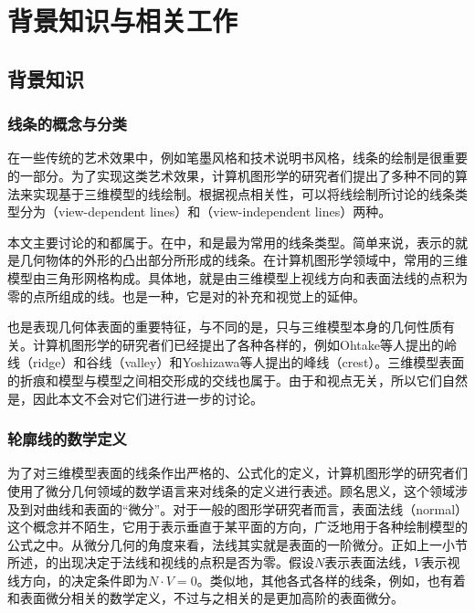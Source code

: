 \chapter{背景知识与相关工作}

\section{背景知识}

\subsection{线条的概念与分类}
\label{sec:diff_geo}

在一些传统的艺术效果中，例如笔墨风格和技术说明书风格，线条的绘制是很重要的一部分。为了实现这类艺术效果，计算机图形学的研究者们提出了多种不同的算法来实现基于三维模型的线绘制。根据视点相关性，可以将线绘制所讨论的线条类型分为\vdl{}（view-dependent lines）和\vidl{}（view-independent lines）两种。

本文主要讨论的\con{}和\scon{}都属于\vdl{}。在\vdl{}中，\con{}和\scon{}是最为常用的线条类型。简单来说，\con{}表示的就是几何物体的外形的凸出部分所形成的线条。在计算机图形学领域中，常用的三维模型由三角形网格构成。具体地，\con{}就是由三维模型上视线方向和表面法线的点积为零的点所组成的线。\scon{}也是一种\vdl{}，它是对\con{}的补充和视觉上的延伸。

\vidl{}也是表现几何体表面的重要特征，与\vdl{}不同的是，\vidl{}只与三维模型本身的几何性质有关。计算机图形学的研究者们已经提出了各种各样的\vdl{}，例如Ohtake等人提出的\cite{ohtake2004ridge}岭线（ridge）和谷线（valley）和Yoshizawa等人提出的峰线（crest）\cite{yoshizawa2005fast}。三维模型表面的折痕和模型与模型之间相交形成的交线也属于\vidl{}。由于\vidl{}和视点无关，所以它们自然是\stc{}，因此本文不会对它们进行进一步的讨论。

\subsection{轮廓线的数学定义}

为了对三维模型表面的线条作出严格的、公式化的定义，计算机图形学的研究者们使用了微分几何领域的数学语言来对线条的定义进行表述。顾名思义，这个领域涉及到对曲线和表面的“微分”。对于一般的图形学研究者而言，表面法线（normal）这个概念并不陌生，它用于表示垂直于某平面的方向，广泛地用于各种绘制模型的公式之中。从微分几何的角度来看，法线其实就是表面的一阶微分。正如上一小节所述，\con{}的出现决定于法线和视线的点积是否为零。假设$N$表示表面法线，$V$表示视线方向，\con{}的决定条件即为$N\cdot{V} = 0$。类似地，其他各式各样的线条，例如\scon{}，也有着和表面微分相关的数学定义，不过与之相关的是更加高阶的表面微分。

